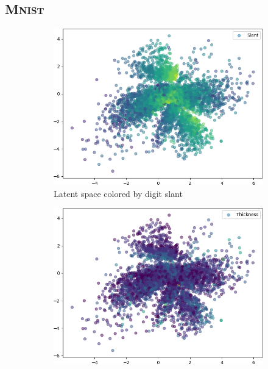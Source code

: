 \subsection{\textsc{Mnist}}\label{subsection:appendix_mnist_latent_space}
\begin{figure}[H]
    \centering
    \begin{subfigure}{.32\textwidth}
        \includegraphics[width=\textwidth]{images/latent_spaces/mnist/vae_gan/embeddings_mu_0.png}
        \caption{Latent space colored by digit slant}
    \end{subfigure}
    \hfill
    \begin{subfigure}{.32\textwidth}
        \includegraphics[width=\textwidth]{images/latent_spaces/mnist/vae_gan/embeddings_mu_1.png}

\end{subfigure}
\end{figure}
